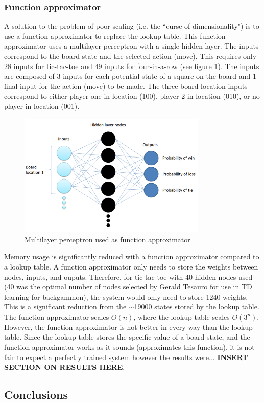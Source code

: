 \documentclass[12pt,a4paper]{article}
\begin{document}
\subsubsection*{Function approximator}
A solution to the problem of poor scaling (i.e. the ``curse of dimensionality") is to use a function approximator to replace the lookup table. This function approximator uses a multilayer perceptron with a single hidden layer. The inputs correspond to the board state and the selected action (move). This requires only 28 inputs for tic-tac-toe and 49 inputs for four-in-a-row (see figure \ref{fig:funcApproxFigure}). The inputs are composed of 3 inputs for each potential state of a square on the board and 1 final input for the action (move) to be made. The three board location inputs correspond to either player one in location (100), player 2 in location (010), or no player in location (001).
\begin{figure}[h]
\centering
\includegraphics[width=0.8\textwidth]{Figures/functionApproxFigure.png}
\caption{Multilayer perceptron used as function approximator}
\label{fig:funcApproxFigure}
\end{figure}
Memory usage is significantly reduced with a function approximator compared to a lookup table. A function approximator only needs to store the weights between nodes, inputs, and ouputs. Therefore, for tic-tac-toe with 40 hidden nodes used (40 was the optimal number of nodes selected by Gerald Tesauro for use in TD learning for backgammon), the system would only need to store 1240 weights. This is a significant reduction from the $\sim$19000 states stored by the lookup table. The function approximator scales $O(n)$, where the lookup table scales $O(3^{n})$. However, the function approximator is not better in every way than the lookup table. Since the lookup table stores the specific value of a board state, and the function approximator works as it sounds (approximates this function), it is not fair to expect a perfectly trained system however the results were... \textbf{INSERT SECTION ON RESULTS HERE}.
\pagebreak
\subsection*{Conclusions}
\end{document}
